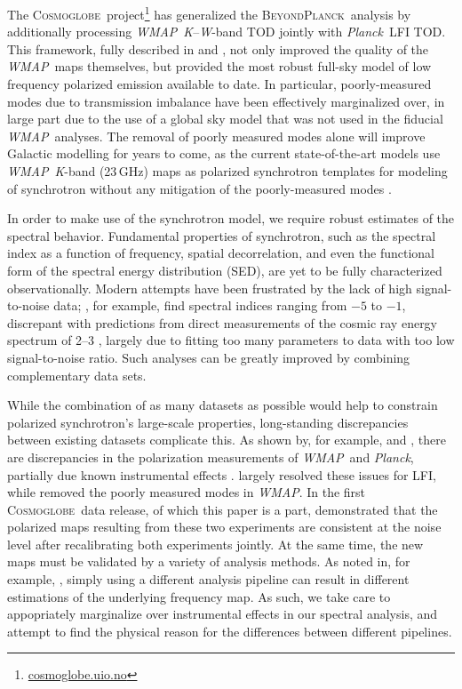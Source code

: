 \documentclass[twocolumn]{../../common/aa}
\def\WMAP{\emph{WMAP}}
\def\Planck{\emph{Planck}}
\newcommand{\bp}{\textsc{BeyondPlanck}}
\newcommand{\cosmoglobe}{\textsc{Cosmoglobe}}
\newcommand{\K}[0]{\textit K}
\newcommand{\W}[0]{\textit W}
\begin{document}
The \cosmoglobe\ project\footnote{\url{cosmoglobe.uio.no}} has generalized the \bp\ analysis by additionally processing \WMAP\ \K--\W-band TOD jointly with \Planck\ LFI TOD. This framework, fully described in \citet{bp17} and \cite{watts2023_dr1},
not only improved the quality of the \WMAP\ maps themselves, but provided the most robust full-sky model of low frequency polarized emission available to date. In particular, poorly-measured modes due to transmission imbalance \citep{jarosik2007} have been effectively marginalized over, in large part due to the use of a global sky model that was not used in the fiducial \WMAP\ analyses. The removal of poorly measured modes alone will improve Galactic modelling for years to come, as the current state-of-the-art models use \WMAP\ \K-band (23\,GHz) maps as polarized synchrotron templates for modeling of synchrotron without any mitigation of the poorly-measured modes \citep{delabrouille2012,pysm2,pysm3}.

In order to make use of the synchrotron model, we require robust estimates of the spectral behavior. Fundamental properties of synchrotron, such as the spectral index as a function of frequency, spatial decorrelation, and even the functional form of the spectral energy distribution (SED), are yet to be fully characterized observationally. Modern attempts have been frustrated by the lack of high signal-to-noise data; \citet{deBelsunce:2022}, for example, find spectral indices ranging from $-5$ to $-1$, discrepant with predictions from direct measurements of the cosmic ray energy spectrum of 2--3 \citep{rybicki,orlando2013,neronov2017}, largely due to fitting too many parameters to data with too low signal-to-noise ratio. Such analyses can be greatly improved by combining complementary data sets.

While the combination of as many datasets as possible would help to constrain polarized synchrotron's large-scale properties, long-standing discrepancies between existing datasets complicate this. As shown by, for example, \citet{planck2014-a12} and \citet{weiland:2018}, there are discrepancies in the polarization measurements of \WMAP\ and \Planck, partially due known instrumental effects \citep{bennett2012,planck2016-l02}. \citet{bp01} largely resolved these issues for LFI, while \citet{bp17} removed the poorly measured modes in \WMAP. In the first \cosmoglobe\ data release, of which this paper is a part, \citet{watts2023_dr1} demonstrated that the polarized maps resulting from these two experiments are consistent at the noise level after recalibrating both experiments jointly. At the same time, the new maps must be validated by a variety of analysis methods. As noted in, for example, \citet{weiland:2022}, simply using a different analysis pipeline can result in different estimations of the underlying frequency map. As such, we take care to appopriately marginalize over instrumental effects in our spectral analysis, and attempt to find the physical reason for the differences between different pipelines.
\end{document}
